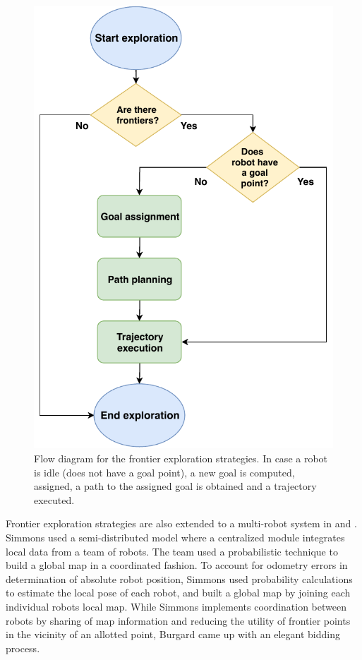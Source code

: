 \begin{figure}[t!]
	\centering\includegraphics[width=0.85\columnwidth]{./pictures/flow_diagram.pdf}
	\caption{Flow diagram for the frontier exploration strategies. In case a robot is idle (does not have a goal point), a new goal is computed, assigned, a path to the assigned goal is obtained and a trajectory executed.}
	\label{fig:flow_diagram}
\end{figure}

Frontier exploration strategies are also extended to a multi-robot system in \cite{Simmons2000} and \cite{Burgard2005}. Simmons \cite{Simmons2000} used a semi-distributed model where a centralized module integrates local data from a team of robots. The team used a probabilistic technique to build a global map in a coordinated fashion. To account for odometry errors in determination of absolute robot position, Simmons used probability calculations to estimate the local pose of each robot, and built a global map by joining each individual robots local map. 
While Simmons \cite{Simmons2000} implements coordination between robots by sharing of map information and reducing the utility of frontier points in the vicinity of an allotted point, Burgard \cite{Burgard2005} came up with an elegant bidding process. 

